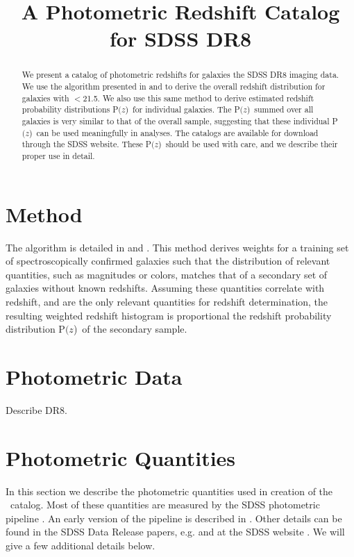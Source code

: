 \documentclass[preprint]{aastex}
\newcommand{\rmax}{21.5}
\newcommand{\pofz}{P$(z$)}
\begin{document}
\title{A Photometric Redshift Catalog for SDSS DR8}



\begin{abstract}

We present a catalog of photometric redshifts for galaxies the SDSS DR8 imaging
data.  We use the algorithm presented in \citet{LimaPhotoz08} and
\citet{CunhaPhotoz09} to derive the overall redshift distribution for galaxies
with \rmag$ < $\rmax.  We also use this same method to derive estimated
redshift probability distributions \pofz\ for individual galaxies.  The \pofz\
summed over all galaxies is very similar to that of the overall sample,
suggesting that these individual \pofz\ can be used meaningfully in analyses.
The catalogs are available for download through the SDSS website.  These \pofz\
should be used with care, and we describe their proper use in detail.

\end{abstract}

\section{Method} \label{sec:method}

The algorithm is detailed in \citet{LimaPhotoz08} and \citet{CunhaPhotoz09}.
This method derives weights for a training set of spectroscopically confirmed
galaxies such that the distribution of relevant quantities, such as magnitudes
or colors, matches that of a secondary set of galaxies without known redshifts.
Assuming these quantities correlate with redshift, and are the only relevant
quantities for redshift determination, the resulting weighted redshift
histogram is proportional the redshift probability distribution \pofz\ of the
secondary sample. 


\section{Photometric Data}
Describe DR8.

\section{Photometric Quantities} \label{sec:photo}

In this section we describe the photometric quantities used in creation of the
\photoz\ catalog.  Most of these quantities are measured by the SDSS
photometric pipeline \photo. An early version of the pipeline is described in
\citet{LuptonADASS01}.  Other details can be found in the SDSS Data Release
papers, e.g. \citet{dr4} and at the SDSS website \citep{sdssorg}.  We will give
a few additional details below.
\end{document}
